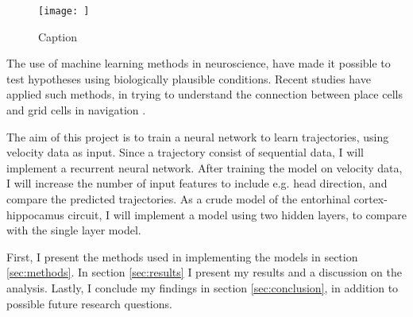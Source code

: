 \begin{figure}
    \centering
    \texttt{[image: ]}
    \caption{Caption}
    \label{fig:enter-label}
\end{figure}

The use of machine learning methods in neuroscience, have made it possible to test hypotheses using biologically plausible conditions. Recent studies have applied such methods, in trying to understand the connection between place cells and grid cells in navigation \cite{banino:2018:vector_based}. 

The aim of this project is to train a neural network to learn trajectories, using velocity data as input. Since a trajectory consist of sequential data, I will implement a recurrent neural network. After training the model on velocity data, I will increase the number of input features to include e.g. head direction, and compare the predicted trajectories. As a crude model of the entorhinal cortex-hippocamus circuit, I will implement a model using two hidden layers, to compare with the single layer model.

First, I present the methods used in implementing the models in section \ref{sec:methods}. In section \ref{sec:results} I present my  results and a discussion on the analysis. Lastly, I conclude my findings in section \ref{sec:conclusion}, in addition to possible future research questions.

